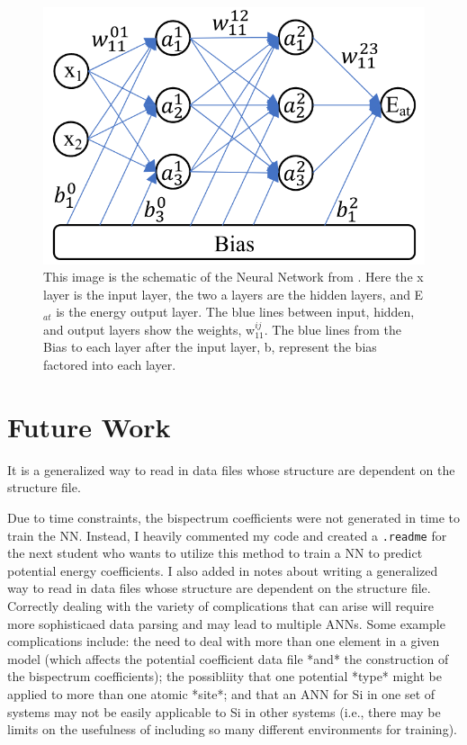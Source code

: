 \documentclass{article}
\begin{document}
\begin{figure}
    \centering
    \includegraphics[scale=0.7]{Images/Yan_sche.png}
    \caption{This image is the schematic of the Neural Network from \cite{Yanxon2020}. Here the x 
    layer is the input layer, the two a layers are the hidden layers, and E$_{at}$ is the energy 
    output layer. The blue lines between input, hidden, and output layers show the weights, 
    w$^{ij}_{11}$. The blue lines from the Bias to each layer after the input layer, b, represent 
    the bias factored into each layer.}
    \label{Yan_sche}
\end{figure}

\section{Future Work}

It is a generalized way to read in data files whose structure are 
dependent on the structure file.

Due to time constraints, the bispectrum coefficients were not generated in time to train the 
NN. Instead, I heavily commented my code and created a \texttt{.readme} for the next student 
who wants to utilize this method to train a NN to predict potential energy coefficients. I 
also added in notes about writing a generalized way to read in data files whose structure are 
dependent on the structure file. Correctly dealing with the variety of complications that can 
arise will require more sophisticaed data parsing and may lead to multiple ANNs. Some example 
complications include: the need to deal with more than one element in a given model (which 
affects the potential coefficient data file *and* the construction of the bispectrum coefficients); 
the possibliity that one potential *type* might be applied to more than one atomic *site*; and that 
an ANN for Si in one set of systems may not be easily applicable to Si in other systems (i.e., 
there may be limits on the usefulness of including so many different environments for training). 
\end{document}
